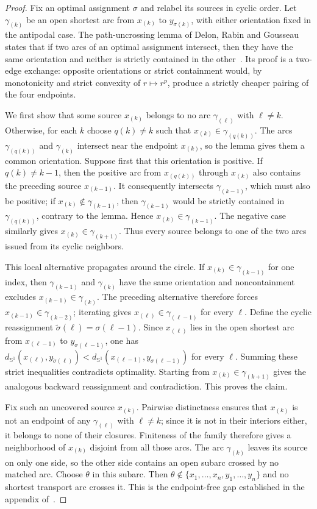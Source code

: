 \begin{proof}
	Fix an optimal assignment $\sigma$ and relabel its sources in cyclic order. Let $\gamma_{(k)}$ be an open shortest arc from $x_{(k)}$ to $y_{\sigma(k)}$, with either orientation fixed in the antipodal case. The path-uncrossing lemma of Delon, Rabin and Gousseau states that if two arcs of an optimal assignment intersect, then they have the same orientation and neither is strictly contained in the other~\cite{DelonRabinGousseau2011Circle}. Its proof is a two-edge exchange: opposite orientations or strict containment would, by monotonicity and strict convexity of $r\mapsto r^p$, produce a strictly cheaper pairing of the four endpoints.

	We first show that some source $x_{(k)}$ belongs to no arc $\gamma_{(\ell)}$ with $\ell\neq k$. Otherwise, for each $k$ choose $q(k)\neq k$ such that $x_{(k)}\in\gamma_{(q(k))}$. The arcs $\gamma_{(q(k))}$ and $\gamma_{(k)}$ intersect near the endpoint $x_{(k)}$, so the lemma gives them a common orientation. Suppose first that this orientation is positive. If $q(k)\neq k-1$, then the positive arc from $x_{(q(k))}$ through $x_{(k)}$ also contains the preceding source $x_{(k-1)}$. It consequently intersects $\gamma_{(k-1)}$, which must also be positive; if $x_{(k)}\notin\gamma_{(k-1)}$, then $\gamma_{(k-1)}$ would be strictly contained in $\gamma_{(q(k))}$, contrary to the lemma. Hence $x_{(k)}\in\gamma_{(k-1)}$. The negative case similarly gives $x_{(k)}\in\gamma_{(k+1)}$. Thus every source belongs to one of the two arcs issued from its cyclic neighbors.

	This local alternative propagates around the circle. If $x_{(k)}\in\gamma_{(k-1)}$ for one index, then $\gamma_{(k-1)}$ and $\gamma_{(k)}$ have the same orientation and noncontainment excludes $x_{(k-1)}\in\gamma_{(k)}$. The preceding alternative therefore forces $x_{(k-1)}\in\gamma_{(k-2)}$; iterating gives $x_{(\ell)}\in\gamma_{(\ell-1)}$ for every $\ell$. Define the cyclic reassignment $\widetilde\sigma(\ell)=\sigma(\ell-1)$. Since $x_{(\ell)}$ lies in the open shortest arc from $x_{(\ell-1)}$ to $y_{\sigma(\ell-1)}$, one has $d_{\mathbb S^1}(x_{(\ell)},y_{\widetilde\sigma(\ell)})<d_{\mathbb S^1}(x_{(\ell-1)},y_{\sigma(\ell-1)})$ for every $\ell$. Summing these strict inequalities contradicts optimality. Starting from $x_{(k)}\in\gamma_{(k+1)}$ gives the analogous backward reassignment and contradiction. This proves the claim.

	Fix such an uncovered source $x_{(k)}$. Pairwise distinctness ensures that $x_{(k)}$ is not an endpoint of any $\gamma_{(\ell)}$ with $\ell\neq k$; since it is not in their interiors either, it belongs to none of their closures. Finiteness of the family therefore gives a neighborhood of $x_{(k)}$ disjoint from all those arcs. The arc $\gamma_{(k)}$ leaves its source on only one side, so the other side contains an open subarc crossed by no matched arc. Choose $\theta$ in this subarc. Then $\theta\notin\{x_1,\ldots,x_n,y_1,\ldots,y_n\}$ and no shortest transport arc crosses it. This is the endpoint-free gap established in the appendix of~\cite{DelonRabinGousseau2011Circle}.


\end{proof}

